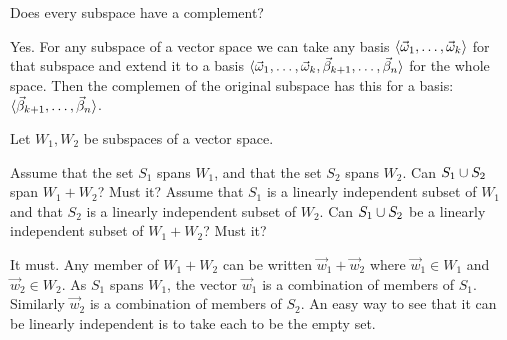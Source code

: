 \begin{exercises}
  \recommended \item 
    Does every subspace have a complement?
    \begin{answer}
      Yes.
      For any subspace of a vector space we can take any
      basis \( \langle\vec{\omega}_1,\dots,\vec{\omega}_k\rangle \) for that
      subspace and extend it to a basis
      \( \langle\vec{\omega}_1,\dots,\vec{\omega}_k,
                     \vec{\beta}_{k+1},\dots,\vec{\beta}_n\rangle \) for the whole
      space.
      Then the complemen of the original subspace has this for a basis:
      \( \langle\vec{\beta}_{k+1},\dots,\vec{\beta}_n\rangle \).  
     \end{answer}
  \recommended \item 
    Let \( W_1, W_2 \) be subspaces of a vector space.
    \begin{exparts}
      \partsitem Assume that 
        the set \( S_1 \) spans \( W_1 \), and that the set \( S_2 \) spans 
        \( W_2 \).
        Can \( S_1\cup S_2 \) span \( W_1+W_2 \)?
        Must it?
      \partsitem Assume that \( S_1 \) is a linearly independent 
        subset of \( W_1 \)
        and that \( S_2 \) is a linearly independent subset of \( W_2 \).
        Can \( S_1\cup S_2 \) be a linearly independent subset of
        \( W_1+W_2 \)?
        Must it?
    \end{exparts}
    \begin{answer}
      \begin{exparts}
        \partsitem It must.
          Any member of \( W_1+W_2 \) can be written \( \vec{w}_1+\vec{w}_2 \)
          where \( \vec{w}_1\in W_1 \) and \( \vec{w}_2\in W_2 \).
          As \( S_1 \) spans \( W_1 \), the vector \( \vec{w}_1 \) is a
          combination of members of \( S_1 \).
          Similarly \( \vec{w}_2 \) is a combination of members of \( S_2 \).
        \partsitem An easy way to see that it can be linearly independent 
          is to take each to be the empty set.

\end{exparts}
\end{answer}
\end{exercises}
